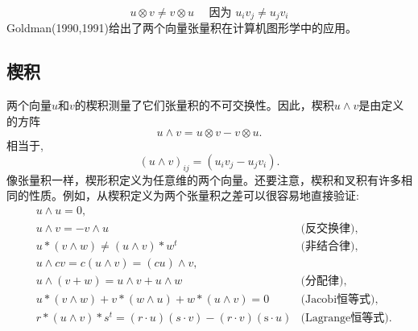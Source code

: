 \begin{CJK}{UTF8}{gbsn}
$$
u \otimes v \neq v \otimes u \quad \text { 因为 } u_{i} v_{j} \neq u_{j} v_{i}
$$
Goldman(1990,1991)给出了两个向量张量积在计算机图形学中的应用。

\subsection*{楔积}
两个向量$u$和$v$的楔积测量了它们张量积的不可交换性。因此，楔积$u \wedge v$是由定义的方阵
$$
u \wedge v=u \otimes v-v \otimes u .
$$
相当于,
$$
(u \wedge v)_{i j}=\left(u_{i} v_{j}-u_{j} v_{i}\right) .
$$
像张量积一样，楔形积定义为任意维的两个向量。还要注意，楔积和叉积有许多相同的性质。例如，从楔积定义为两个张量积之差可以很容易地直接验证:
$$
\begin{aligned}
& u \wedge u=0, \\
& u \wedge v=-v \wedge u &\text{(反交换律)},\\
& u *(v \wedge w) \neq(u \wedge v) * w^{t} &\text{(非结合律)},\\
& u \wedge cv=c(u \wedge v)=(cu) \wedge v, & \\
& u \wedge(v+w)=u \wedge v+u \wedge w &\text{(分配律)},\\
& u *(v \wedge w)+v *(w \wedge u)+w *(u \wedge v)=0 &\text{(Jacobi恒等式)},\\
& r *(u \wedge v) * s^{t}=(r \cdot u)(s \cdot v)-(r \cdot v)(\mathrm{s} \cdot u) &\text{(Lagrange恒等式)}.
\end{aligned}
$$


\end{CJK}
